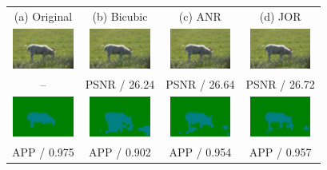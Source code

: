 \documentclass[10pt,twocolumn,letterpaper]{article}
\begin{document}
\begin{figure} [tb]
\begin{tabular*}{0.5\textwidth}{cccc} 
 (a) Original & (b) Bicubic & (c) ANR & (d) JOR \\  
\hspace{-2mm}
\includegraphics[width=2cm]{fig/1_30_s_o_lmnn_5_img.jpg} & \hspace{-4mm}
\includegraphics[width=2cm]{fig/1_30_s_B_lmnn_5_img.jpg} & \hspace{-4mm}
\includegraphics[width=2cm]{fig/1_30_s_A_lmnn_5_img.jpg} & \hspace{-4mm}
\includegraphics[width=2cm]{fig/1_30_s_J_lmnn_5_img.jpg} \\
-- & PSNR / 26.24  & PSNR / 26.64  & PSNR / 26.72 \\    \hspace{-2mm}
\includegraphics[width=2cm]{fig/1_30_s_o_lmnn_5_label.jpg} & \hspace{-4mm}
\includegraphics[width=2cm]{fig/1_30_s_B_lmnn_5_label.jpg} &\hspace{-4mm}
\includegraphics[width=2cm]{fig/1_30_s_A_lmnn_5_label.jpg} &\hspace{-4mm}
\includegraphics[width=2cm]{fig/1_30_s_J_lmnn_5_label.jpg} \\
APP / 0.975 & APP / 0.902 & APP / 0.954 & APP / 0.957 \\


\end{tabular*}
\end{figure}
\end{document}
